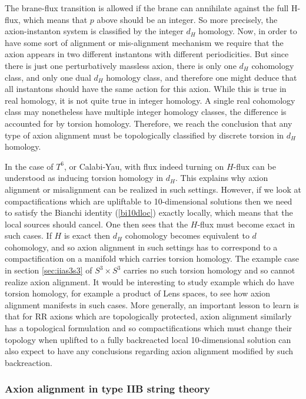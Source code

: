\documentclass[11pt,a4paper]{article}
\numberwithin{equation}{section}
\numberwithin{table}{section}\setlength{\multlinegap}{25pt}
\begin{document}
The brane-flux transition is allowed if the brane can annihilate against the full H-flux, which means that $p$ above should be an integer. So more precisely, the axion-instanton system is classified by the integer $d_H$ homology. Now, in order to have some sort of alignment or mis-alignment mechanism we require that the axion appears in two different instantons with different periodicities. But since there is just one perturbatively massless axion, there is only one $d_H$ cohomology class, and only one dual $d_H$ homology class, and therefore one might deduce that all instantons should have the same action for this axion. While this is true in real homology, it is not quite true in integer homology. A single real cohomology class may nonetheless have multiple integer homology classes, the difference is accounted for by torsion homology. Therefore, we reach the conclusion that any type of axion alignment must be topologically classified by discrete torsion in $d_H$ homology. 

In the case of $T^6$, or Calabi-Yau, with flux indeed turning on $H$-flux can be understood as inducing torsion homology in $d_H$. This explains why axion alignment or misalignment can be realized in such settings. However, if we look at compactifications which are upliftable to 10-dimensional solutions then we need to satisfy the Bianchi identity (\ref{bi10dloc}) exactly locally, which means that the local sources should cancel. One then sees that the $H$-flux must become exact in such cases. If $H$ is exact then $d_H$ cohomology becomes equivalent to $d$ cohomology, and so axion alignment in such settings has to correspond to a compactification on a manifold which carries torsion homology. The example case in section \ref{sec:iias3s3} of $S^3 \times S^3$ carries no such torsion homology and so cannot realize axion alignment. It would be interesting to study example which do have torsion homology, for example a product of Lens spaces, to see how axion alignment manifests in such cases. More generally, an important lesson to learn is that for RR axions which are topologically protected, axion alignment similarly has a topological formulation and so compactifications which must change their topology when uplifted to a fully backreacted local 10-dimensional solution can also expect to have any conclusions regarding axion alignment modified by such backreaction.

\subsubsection*{Axion alignment in type IIB string theory}
\end{document}
